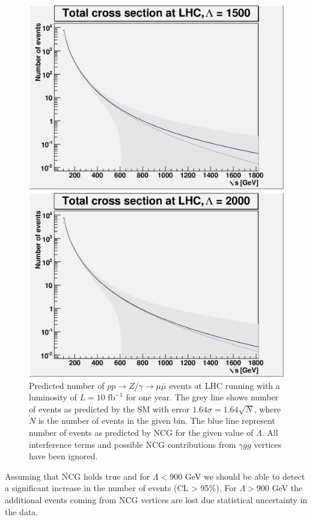 \begin{figure}[h!tp]
\begin{minipage}[b]{0.475\linewidth}
	  \includegraphics[scale=0.35]{./images/L1500r139.eps}
	\end{minipage}
	\begin{minipage}[b]{0.475\linewidth}
    \centering
	  \includegraphics[scale=0.35]{./images/L2000r139.eps}
	\end{minipage}
		\caption{Predicted number of $pp \rightarrow Z/ \gamma \rightarrow \mu \bar \mu$ events at LHC running with a luminosity of $L=10 \textrm{ fb}^{-1}$ for one year. The grey line shows number of events as predicted by the SM with error $1.64\sigma = 1.64\sqrt{N}$, where $N$ is the number of events in the given bin. The blue line represent number of events as predicted by NCG for the given value of $\Lambda$. All interference terms and possible NCG contributions from $\gamma gg$ vertices have been ignored.} \label{fig:lambdaplot}
\end{figure}

Assuming that NCG holds true and for $\Lambda < 900$ GeV we should be able to detect a significant increase in the number of events (CL > 95\%). For $\Lambda > 900$ GeV the additional events coming from NCG vertices are lost due statistical uncertainty in the data.